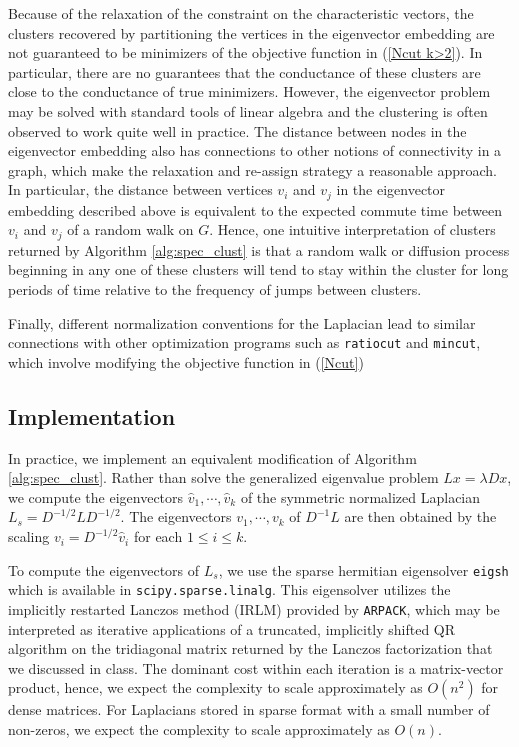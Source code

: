 \documentclass[11pt]{article}
\begin{document}
Because of the relaxation of the constraint on the characteristic vectors, the clusters recovered by partitioning the vertices in the eigenvector embedding are not guaranteed to be minimizers of the objective function in (\ref{Ncut k>2}). In particular, there are no guarantees that the conductance of these clusters are close to the conductance of true minimizers. However, the eigenvector problem may be solved with standard tools of linear algebra and the clustering is often observed to work quite well in practice. The distance between nodes in the eigenvector embedding also has connections to other notions of connectivity in a graph, which make the relaxation and re-assign strategy a reasonable approach. In particular, the distance between vertices $v_i$ and $v_j$ in the eigenvector embedding described above is equivalent to the expected commute time between $v_i$ and $v_j$ of a random walk on $G$. Hence, one intuitive interpretation of clusters returned by Algorithm \ref{alg:spec_clust} is that a random walk or diffusion process beginning in any one of these clusters will tend to stay within the cluster for long periods of time relative to the frequency of jumps between clusters.

Finally, different normalization conventions for the Laplacian lead to similar connections with other optimization programs such as \texttt{ratiocut} and \texttt{mincut}, which involve modifying the objective function in (\ref{Ncut})

\subsection*{Implementation}

In practice, we implement an equivalent modification of Algorithm \ref{alg:spec_clust}. Rather than solve the generalized eigenvalue problem $Lx=\lambda Dx$, we compute the eigenvectors $\hat v_1,\cdots, \hat v_k$ of the symmetric normalized Laplacian $L_s = D^{-1/2}LD^{-1/2}$. The eigenvectors $v_1,\cdots,v_k$ of $D^{-1}L$ are then obtained by the scaling $v_i=D^{-1/2}\hat v_i$ for each $1\leq i\leq k$.

To compute the eigenvectors of $L_s$, we use the sparse hermitian eigensolver {\tt eigsh} which is available in {\tt scipy.sparse.linalg}. This eigensolver utilizes the implicitly restarted Lanczos method (IRLM) provided by {\tt ARPACK}, which may be interpreted as iterative applications of a truncated, implicitly shifted QR algorithm on the tridiagonal matrix returned by the Lanczos factorization that we discussed in class. The dominant cost within each iteration is a matrix-vector product, hence, we expect the complexity to scale approximately as $O(n^2)$ for dense matrices. For Laplacians stored in sparse format with a small number of non-zeros, we expect the complexity to scale approximately as $O(n)$. 
\end{document}
